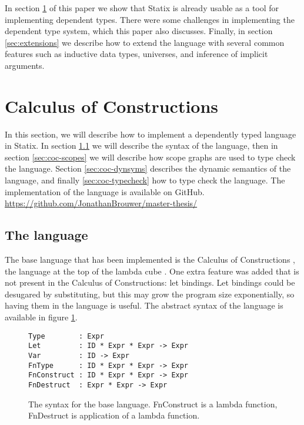 \documentclass[a4paper,UKenglish,cleveref, autoref, thm-restate]{oasics-v2021}
\begin{document}
In section \ref{sec:coc} of this paper we show that Statix is already usable as a tool for implementing dependent types. There were some challenges in implementing the dependent type system, which this paper also discusses. Finally, in section \ref{sec:extensions} we describe how to extend the language with several common features such as inductive data types, universes, and inference of implicit arguments.

\section{Calculus of Constructions}
\label{sec:coc}

In this section, we will describe how to implement a dependently typed language in Statix. In section \ref{sec:coc-syntax} we will describe the syntax of the language, then in section \ref{sec:coc-scopes} we will describe how scope graphs are used to type check the language. Section \ref{sec:coc-dynsyms} describes the dynamic semantics of the language, and finally \ref{sec:coc-typecheck} how to type check the language. The implementation of the language is available on GitHub. 
\url{https://github.com/JonathanBrouwer/master-thesis/}

\subsection{The language}
\label{sec:coc-syntax}

The base language that has been implemented is the Calculus of Constructions \cite{Coquand_Huet_1988}, the language at the top of the lambda cube \cite{lambda_cube}. One extra feature was added that is not present in the Calculus of Constructions: let bindings. Let bindings could be desugared by substituting, but this may grow the program size exponentially, so having them in the language is useful. The abstract syntax of the language is available in figure \ref{fig:syntax}.

\begin{figure}[h]
\begin{lstlisting}
Type        : Expr
Let         : ID * Expr * Expr -> Expr
Var         : ID -> Expr
FnType      : ID * Expr * Expr -> Expr
FnConstruct : ID * Expr * Expr -> Expr
FnDestruct  : Expr * Expr -> Expr
\end{lstlisting}
\caption{The syntax for the base language. FnConstruct is a lambda function, FnDestruct is application of a lambda function.}
\label{fig:syntax}
\end{figure}
\end{document}
